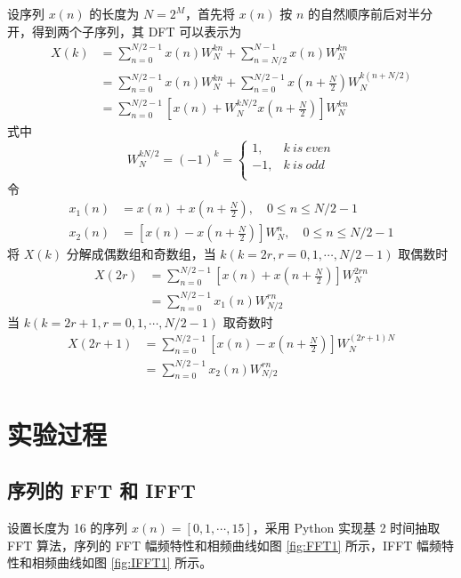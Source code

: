 \documentclass[12pt,AutoFakeBold]{article}
\begin{document}
设序列 $x(n)$ 的长度为 $N=2^M$，首先将 $x(n)$ 按 $n$ 的自然顺序前后对半分开，得到两个子序列，其 DFT 可以表示为
%
\begin{align*}
X(k) &= \sum_{n=0}^{N/2-1}x(n)W_N^{kn}+\sum_{n=N/2}^{N-1}x(n)W_N^{kn} \\
     &= \sum_{n=0}^{N/2-1}x(n)W_N^{kn}+\sum_{n=0}^{N/2-1}x\left(n+\frac{N}{2}\right)W_N^{k(n+N/2)} \\
     &= \sum_{n=0}^{N/2-1}\left[x(n)+W_N^{kN/2}x\left(n+\frac{N}{2}\right)\right]W_N^{kn}
\end{align*}
%
式中
%
\begin{equation*}
W_N^{kN/2}=(-1)^k=\begin{cases}
1, & k\ is\ even \\
-1, & k\ is\ odd \\
\end{cases}
\end{equation*}
%
令
%
\begin{align*}
x_1(n) &= x(n)+x\left(n+\frac{N}{2}\right),\quad 0\le n\le N/2-1 \\
x_2(n) &= \left[x(n)-x\left(n+\frac{N}{2}\right)\right]W_N^n,\quad 0\le n\le N/2-1
\end{align*}
%
将 $X(k)$ 分解成偶数组和奇数组，当 $k(k=2r,r=0,1,\cdots,N/2-1)$ 取偶数时
%
\begin{align*}
X(2r) &= \sum_{n=0}^{N/2-1}\left[x(n)+x\left(n+\frac{N}{2}\right)\right]W_N^{2rn} \\
      &= \sum_{n=0}^{N/2-1}x_1(n)W_{N/2}^{rn}
\end{align*}
%
当 $k(k=2r+1,r=0,1,\cdots,N/2-1)$ 取奇数时
%
\begin{align*}
X(2r+1) &= \sum_{n=0}^{N/2-1}\left[x(n)-x\left(n+\frac{N}{2}\right)\right]W_N^{(2r+1)N} \\
        &= \sum_{n=0}^{N/2-1}x_2(n)W_{N/2}^{rn}
\end{align*}
%

\section{实验过程}

\subsection{序列的 FFT 和 IFFT} \label{sec:p1}

设置长度为 16 的序列 $x(n)=[0,1,\cdots,15]$，采用 Python 实现基 2 时间抽取 FFT 算法，序列的 FFT 幅频特性和相频曲线如图 \ref{fig:FFT1} 所示，IFFT 幅频特性和相频曲线如图 \ref{fig:IFFT1} 所示。
\end{document}
